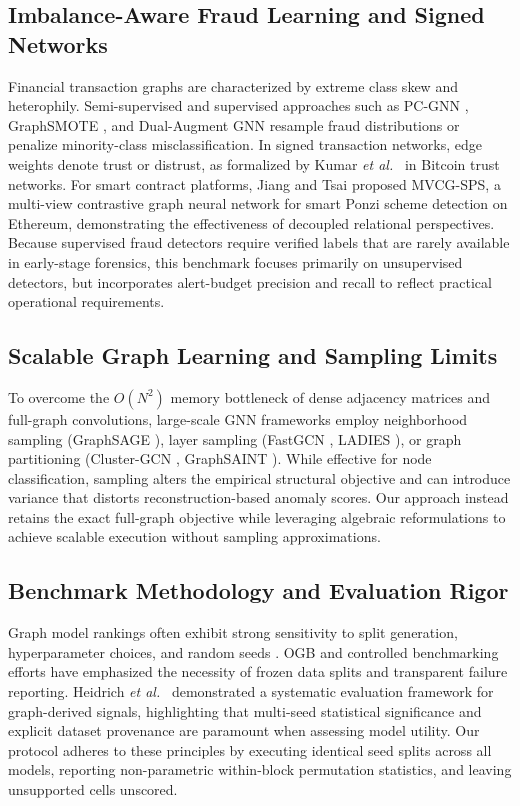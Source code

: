 \documentclass[applsci,article,submit,moreauthors,pdftex]{Definitions/mdpi}
\newcommand{\etal}{\emph{et al.}}
\begin{document}
\subsection{Imbalance-Aware Fraud Learning and Signed Networks}
Financial transaction graphs are characterized by extreme class skew and heterophily. Semi-supervised and supervised approaches such as PC-GNN \cite{liu2021pcgnn}, GraphSMOTE \cite{zhao2021graphsmote}, and Dual-Augment GNN \cite{li2022dualaugment} resample fraud distributions or penalize minority-class misclassification. In signed transaction networks, edge weights denote trust or distrust, as formalized by Kumar \etal\ \cite{kumar2016edge} in Bitcoin trust networks. For smart contract platforms, Jiang and Tsai \cite{jiang2025mvcg} proposed MVCG-SPS, a multi-view contrastive graph neural network for smart Ponzi scheme detection on Ethereum, demonstrating the effectiveness of decoupled relational perspectives. Because supervised fraud detectors require verified labels that are rarely available in early-stage forensics, this benchmark focuses primarily on unsupervised detectors, but incorporates alert-budget precision and recall to reflect practical operational requirements.

\subsection{Scalable Graph Learning and Sampling Limits}
To overcome the $O(N^2)$ memory bottleneck of dense adjacency matrices and full-graph convolutions, large-scale GNN frameworks employ neighborhood sampling (GraphSAGE \cite{hamilton2017graphsage}), layer sampling (FastGCN \cite{chen2018fastgcn}, LADIES \cite{zou2019ladies}), or graph partitioning (Cluster-GCN \cite{chiang2019clustergcn}, GraphSAINT \cite{zeng2020graphsaint}). While effective for node classification, sampling alters the empirical structural objective and can introduce variance that distorts reconstruction-based anomaly scores. Our approach instead retains the exact full-graph objective while leveraging algebraic reformulations to achieve scalable execution without sampling approximations.

\subsection{Benchmark Methodology and Evaluation Rigor}
Graph model rankings often exhibit strong sensitivity to split generation, hyperparameter choices, and random seeds \cite{shchur2018pitfalls,errica2020fair}. OGB \cite{hu2020ogb} and controlled benchmarking efforts \cite{dwivedi2023benchmarking} have emphasized the necessity of frozen data splits and transparent failure reporting. Heidrich \etal\ \cite{heidrich2026systematic} demonstrated a systematic evaluation framework for graph-derived signals, highlighting that multi-seed statistical significance and explicit dataset provenance are paramount when assessing model utility. Our protocol adheres to these principles by executing identical seed splits across all models, reporting non-parametric within-block permutation statistics, and leaving unsupported cells unscored.
\end{document}
